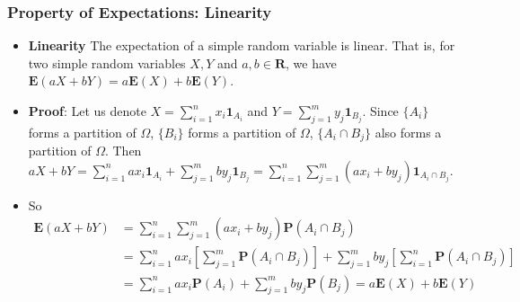 \documentclass[handout]{beamer}
\newcommand{\BP}{\mathbf{P}}
\newcommand{\BE}{\mathbf{E}}
\newcommand{\BI}{\mathbf{1}}
\begin{document}
\frame
{
  \frametitle{Property of Expectations: Linearity}

   \begin{itemize}


\item<1-> \textbf{Linearity} The expectation of a simple random variable is linear. That is, for two simple random variables $X, Y$ and $a,b \in \mathbf{R}$, we have $\BE(aX+bY)=a\BE(X)+b\BE(Y)$.
                         
\item<2-> \textbf{Proof}: Let us denote $X=\sum_{i=1}^n x_i \BI_{A_i}$ and $Y=\sum_{j=1}^m y_j \BI_{B_j}$. Since $\{A_i\}$ forms a partition of $\Omega$, $\{B_i\}$ forms a partition of $\Omega$, $\{A_i\cap B_j\}$ also forms a partition of $\Omega$. Then $aX+bY=\sum_{i=1}^n a x_i \BI_{A_i}+\sum_{j=1}^m b y_j \BI_{B_j}=\sum_{i=1}^n \sum_{j=1}^m  (a x_i+b y_j)  \BI_{A_i \cap B_j}$. 
                                                  
\item<3->[-] So 
\begin{align*}
\BE(aX+bY)& =\sum_{i=1}^n \sum_{j=1}^m  (a x_i+b y_j)  \BP(A_i \cap B_j) \\ & =\sum_{i=1}^n  a x_i \left[\sum_{j=1}^m \BP(A_i \cap B_j)\right]+ \sum_{j=1}^m  b y_j \left[ \sum_{i=1}^n \BP(A_i \cap B_j) \right] \\ &=\sum_{i=1}^n  a x_i \BP(A_i )+ \sum_{j=1}^m  b y_j \BP(B_j)=a\BE(X)+b\BE(Y)
\end{align*}
                                                  
                             
                    \end{itemize}
}
\end{document}
